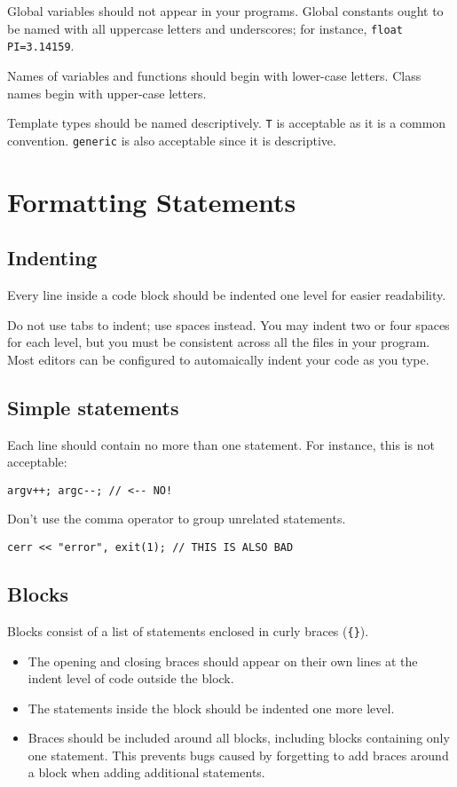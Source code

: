 \documentclass{article}
\newcommand{\code}[1]{\texttt{\colorbox{gray!30}{#1}}}
\begin{document}
Global variables should not appear in your programs.
Global constants ought to be named with all uppercase letters and underscores; for instance, \code{float PI=3.14159}.

Names of variables and functions should begin with lower-case letters.
Class names begin with upper-case letters.

Template types should be named descriptively.
\code{T} is acceptable as it is a common convention.
\code{generic} is also acceptable since it is descriptive.

\section{Formatting Statements}
\subsection{Indenting}
Every line inside a code block should be indented one level for easier readability.

Do not use tabs to indent; use spaces instead.
You may indent two or four spaces for each level, but you must be consistent across all the files in your program.
Most editors can be configured to automaically indent your code as you type.

\subsection{Simple statements}
Each line should contain no more than one statement.
For instance, this is not acceptable:
\begin{lstlisting}
argv++; argc--; // <-- NO!
\end{lstlisting}

Don't use the comma operator to group unrelated statements.
\begin{lstlisting}
cerr << "error", exit(1); // THIS IS ALSO BAD
\end{lstlisting}

\subsection{Blocks}
Blocks consist of a list of statements enclosed in curly braces (\code{\{\}}).
\begin{itemize}
	\item The opening and closing braces should appear on their own lines at the indent level of code outside the block.
	\item The statements inside the block should be indented one more level.
	\item Braces should be included around all blocks, including blocks containing only one statement.
		This prevents bugs caused by forgetting to add braces around a block when adding additional statements.
\end{itemize}
\end{document}
